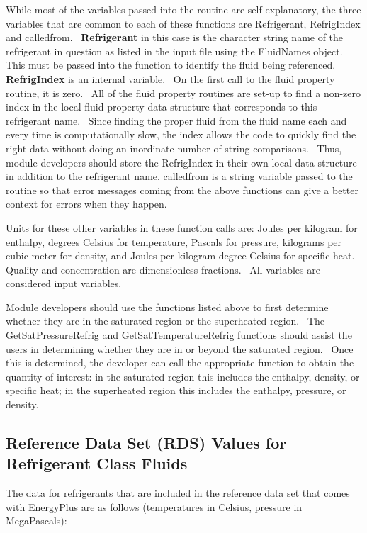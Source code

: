 While most of the variables passed into the routine are self-explanatory, the three variables that are common to each of these functions are Refrigerant, RefrigIndex and calledfrom.~ \textbf{Refrigerant} in this case is the character string name of the refrigerant in question as listed in the input file using the FluidNames object.~ This must be passed into the function to identify the fluid being referenced.~ \textbf{RefrigIndex} is an internal variable.~ On the first call to the fluid property routine, it is zero.~ All of the fluid property routines are set-up to find a non-zero index in the local fluid property data structure that corresponds to this refrigerant name.~ Since finding the proper fluid from the fluid name each and every time is computationally slow, the index allows the code to quickly find the right data without doing an inordinate number of string comparisons.~ Thus, module developers should store the RefrigIndex in their own local data structure in addition to the refrigerant name. calledfrom is a string variable passed to the routine so that error messages coming from the above functions can give a better context for errors when they happen.

Units for these other variables in these function calls are: Joules per kilogram for enthalpy, degrees Celsius for temperature, Pascals for pressure, kilograms per cubic meter for density, and Joules per kilogram-degree Celsius for specific heat.~ Quality and concentration are dimensionless fractions.~ All variables are considered input variables.

Module developers should use the functions listed above to first determine whether they are in the saturated region or the superheated region.~ The GetSatPressureRefrig and GetSatTemperatureRefrig functions should assist the users in determining whether they are in or beyond the saturated region.~ Once this is determined, the developer can call the appropriate function to obtain the quantity of interest: in the saturated region this includes the enthalpy, density, or specific heat; in the superheated region this includes the enthalpy, pressure, or density.

\subsection{Reference Data Set (RDS) Values for Refrigerant Class Fluids}\label{reference-data-set-rds-values-for-refrigerant-class-fluids}

The data for refrigerants that are included in the reference data set that comes with EnergyPlus are as follows (temperatures in Celsius, pressure in MegaPascals):

